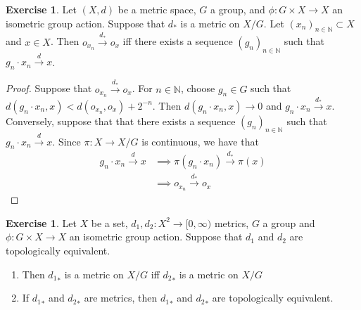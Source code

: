 \documentclass[12pt]{amsart}
\theoremstyle{definition}
\newtheorem{ex}[definition]{Exercise}
\newcommand{\N}{\mathbb{N}}
\newcommand{\Rg}{[0,\infty)}
\newcommand{\conv}[1]{\xrightarrow{#1}}
\newcommand{\lex}[1]{\label{ex:#1}}
\begin{document}
	\begin{ex} \lex{}
	Let $(X, d)$ be a metric space, $G$ a group, and $\phi: G \times X \rightarrow X$ an isometric group action. Suppose that $d_*$ is a metric on $X/G$. Let $(x_n)_{n \in \N} \subset X$ and $x \in X$. Then $o_{x_n} \conv{d_*} o_x$ iff there exists a sequence $(g_n)_{n \in \N}$ such that $g_n \cdot x_n \conv{d} x$.
	\end{ex}
	
	\begin{proof} 
	Suppose that $o_{x_n} \conv{d_*} o_x$. For $n \in \N$, choose $g_n \in G$ such that $d(g_n \cdot x_n, x) < d(o_{x_n}, o_x) + 2^{-n}$. Then $d(g_n \cdot x_n, x) \rightarrow 0$ and $g_n \cdot x_n \conv{d_*} x$.  \\
	Conversely, suppose that that there exists a sequence $(g_n)_{n \in \N}$ such that $g_n \cdot x_n \conv{d} x$. Since $\pi:X \rightarrow X/G$ is continuous, we have that
	\begin{align*}
	g_n \cdot x_n \conv{d} x
	& \implies \pi(g_n \cdot x_n) \conv{d_*} \pi(x)\\
	& \implies o_{x_n}  \conv{d_*} o_x
	\end{align*}
	\end{proof}		
	
	\begin{ex} \lex{}
	Let $X$ be a set, $d_1, d_2: X^2 \rightarrow \Rg$ metrics, $G$ a group and $\phi: G \times X \rightarrow X$ an isometric group action. Suppose that $d_1$ and $d_2$ are topologically equivalent. 
	\begin{enumerate}
	\item Then ${d_1}_*$ is a metric on $X/G$ iff ${d_2}_*$ is a metric on $X/G$
	\item If ${d_1}_*$ and ${d_2}_*$ are metrics, then ${d_1}_*$ and ${d_2}_*$ are topologically equivalent. 
	\end{enumerate}
	\end{ex}
	
\end{document}
